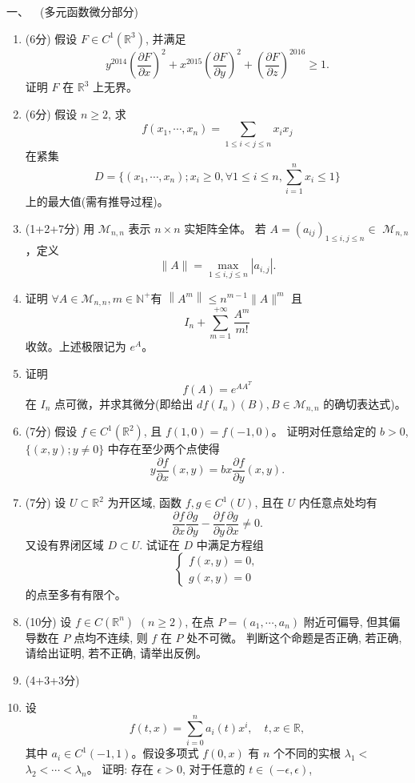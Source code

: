 一、\ \ (多元函数微分部分)
\begin{enumerate}
\item (6分) 假设 $F \in C^1(\mathbb{R}^3)$, 并满足
$$y^{2014}\left(\frac{\partial F}{\partial x}\right)^2
+x^{2015}\left(\frac{\partial F}{\partial y}\right)^2
+\left(\frac{\partial F}{\partial z}\right)^{2016} \geq 1.$$
证明 $F$ 在 $\mathbb{R}^3$ 上无界。
\item (6分) 假设 $n \geq 2$, 求
$$f(x_1, \cdots, x_n)=\sum_{1 \leq i<j \leq n} x_i x_j$$
在紧集
$$D=\{(x_1, \cdots, x_n) ; x_i \geq 0, \forall 1 \leq i \leq n, \sum_{i=1}^n x_i \leq 1\}$$
上的最大值(需有推导过程)。
\item (1+2+7分) 用 $\mathcal{M}_{n, n}$ 表示 $n \times n$ 实矩阵全体。
若 $A=(a_{i j})_{1 \leq i, j \leq n} \in$ $\mathcal{M}_{n, n}$，定义
$$\|A\|=\max_{1 \leq i, j \leq n}|a_{i, j}|.$$
\item[\bullet] 证明 $\forall A \in \mathcal{M}_{n, n}, m \in \mathbb{N}^{+}$有 $\left\|A^m\right\| \leq n^{m-1}\|A\|^m$ 且
$$I_n+\sum_{m=1}^{+\infty} \frac{A^m}{m!}$$
收敛。上述极限记为 $e^A$。
\item[\bullet] 证明
$$f(A)=e^{A A^T}$$
在 $I_n$ 点可微，并求其微分(即给出 $df(I_n)(B), B \in \mathcal{M}_{n, n}$ 的确切表达式)。
\item (7分) 假设 $f \in C^1(\mathbb{R}^2)$, 且 $f(1,0)=f(-1,0)$。
证明对任意给定的 $b>0$, $\{(x, y) ; y \neq 0\}$ 中存在至少两个点使得
$$y \frac{\partial f}{\partial x}(x, y)=b x \frac{\partial f}{\partial y}(x, y).$$
\item (7分) 设 $U \subset \mathbb{R}^2$ 为开区域, 
函数 $f, g \in C^1(U)$, 且在 $U$ 内任意点处均有
$$\frac{\partial f}{\partial x} \frac{\partial g}{\partial y}
-\frac{\partial f}{\partial y} \frac{\partial g}{\partial x} \neq 0.$$
又设有界闭区域 $D \subset U$. 试证在 $D$ 中满足方程组
$$\begin{cases}f(x, y)=0, \\g(x, y)=0\end{cases}$$
的点至多有有限个。
\item (10分) 设 $f \in C(\mathbb{R}^n)$ $(n \geq 2)$, 
在点 $P=(a_1, \cdots, a_n)$ 附近可偏导, 
但其偏导数在 $P$ 点均不连续, 则 $f$ 在 $P$ 处不可微。
判断这个命题是否正确, 若正确, 请给出证明, 若不正确, 请举出反例。
\item (4+3+3分)
\item[\bullet] 设
$$f(t, x)=\sum_{i=0}^n a_i(t) x^i, \quad t, x \in \mathbb{R},$$
其中 $a_i \in C^1(-1,1)$。假设多项式 $f(0, x)$ 有 $n$ 个不同的实根 $\lambda_1<$ $\lambda_2<\cdots<\lambda_n$。
证明: 存在 $\epsilon>0$, 对于任意的 $t \in(-\epsilon, \epsilon)$, 

\end{enumerate}
